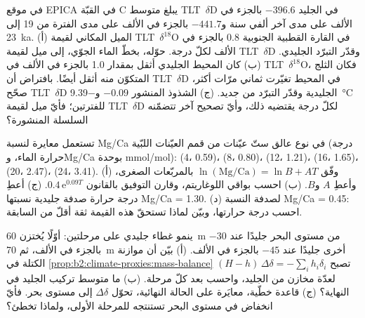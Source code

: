 \begin{exercise}[$\star\star\star$]\label{exo:b2:climate-proxies:10}
في موقع EPICA في القبّة C يبلغ متوسط \mbox{\textdir TLT $\delta$D} في الجليد $-396.6$ بالجزء في الألف على مدى آخر ألفي سنة
و$-441.7$ بالجزء في الألف على مدى الفترة من 19 إلى \qty{23}{ka}. (أ) الميل المكاني لقيمة \mbox{\textdir TLT $\delta^{18}$O} في القارة القطبية الجنوبية
\num{0.8} بالجزء في الألف لكلّ درجة. حوّله، بخطّ الماء الجوّي، إلى ميل لقيمة \mbox{\textdir TLT $\delta$D}
وقدّر التبرّد الجليدي. (ب) كان المحيط الجليدي أثقل بمقدار \num{1.0} بالجزء في الألف في
\mbox{\textdir TLT $\delta^{18}$O}، فكان الثلج المتكوّن منه أثقل أيضًا. بافتراض أن \mbox{\textdir TLT $\delta$D} في المحيط
تغيّرت ثماني مرّات أكثر، صحّح \mbox{\textdir TLT $\delta$D} الجليدية وقدّر التبرّد من جديد.
(ج) الشذوذ المنشور $-0.09$ و\qty{-9.39}{\celsius} للفترتين؛ فأيّ ميل لقيمة
\mbox{\textdir TLT $\delta$D} لكلّ درجة يقتضيه ذلك، وأيّ تصحيح آخر تتضمّنه السلسلة المنشورة؟
\end{exercise}

\begin{exercise}[$\star\star\star$]\label{exo:b2:climate-proxies:11}
تستعمل معايرة لنسبة Mg/Ca في نوع عالق ستّ عيّنات من قمم العيّنات اللبّية (درجة حرارة الماء،
وMg/Ca بوحدة \unit{mmol/mol}): (4، 0.59)، (8، 0.80)، (12، 1.21)، (16، 1.65)، (20، 2.47)، (24، 3.41).
(أ) وفّق $\ln(\text{Mg/Ca}) = \ln B + AT$ بالمربّعات الصغرى، وأعطِ $A$ و$B$. (ب) احسب
بواقي اللوغاريتم، وقارن التوفيق بالقانون $0.4\,\mathrm{e}^{0.09T}$. (ج) أعطِ
درجة حرارة صدفة جليدية نسبتها Mg/Ca = 1.30. (د) لصدفة النسبة Mg/Ca = 0.45: احسب
درجة حرارتها، وبيّن لماذا تستحقّ هذه القيمة ثقة أقلّ من السابقة.
\end{exercise}

\begin{exercise}[$\star\star\star$]\label{exo:b2:climate-proxies:12}
ينمو غطاء جليدي على مرحلتين: أوّلًا يُختزن \qty{60}{m} من مستوى البحر جليدًا عند $-30$ بالجزء في الألف،
ثم \qty{70}{m} أخرى جليدًا عند $-45$ بالجزء في الألف. (أ) بيّن أن موازنة الكتلة في
\cref{prop:b2:climate-proxies:mass-balance} تصبح $(H - h)\,\Delta\delta = -\sum_i h_i\delta_i$
لعدّة مخازن من الجليد، واحسب  بعد كلّ مرحلة. (ب) ما متوسط
تركيب الجليد في النهاية؟ (ج) قاعدة خطّية، معايَرة على الحالة النهائية، تحوّل
$\Delta\delta$ إلى مستوى بحر. فأيّ انخفاض في مستوى البحر تستنتجه للمرحلة الأولى، ولماذا
تخطئ؟
\end{exercise}


